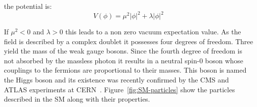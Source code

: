 the potential is:
\begin{equation}
\label{eq:higgs-potential}
V(\phi) = \mu^2|\phi|^2 + \lambda|\phi|^2
\end{equation}

If $\mu^2 < 0$ and $\lambda > 0$ this leads to a non zero vacuum expectation value. 
As the field is described by a complex doublet it possesses four degrees of freedom. 
Three yield the mass of the weak gauge bosons. Since the fourth degree of freedom is 
not absorbed by the massless photon it results in a neutral spin-0 boson whose couplings 
to the fermions are proportional to their masses. This boson is named the Higgs boson and
its existence was recently confirmed by the CMS and ATLAS experiments at CERN~\cite{Chatrchyan:2012ufa,Aad:2012tfa}.
Figure~\ref{fig:SM-particles} show the particles described in the SM along with their properties.

